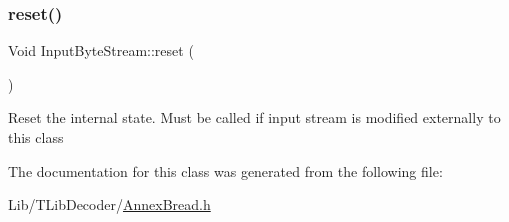 \subsubsection{\texorpdfstring{reset()}{reset()}}
{\footnotesize\ttfamily Void Input\+Byte\+Stream\+::reset (\begin{DoxyParamCaption}{ }\end{DoxyParamCaption})\hspace{0.3cm}{\ttfamily [inline]}}

Reset the internal state. Must be called if input stream is modified externally to this class 

The documentation for this class was generated from the following file\+:\begin{DoxyCompactItemize}
\item 
Lib/\+T\+Lib\+Decoder/\hyperlink{_annex_bread_8h}{Annex\+Bread.\+h}\end{DoxyCompactItemize}
